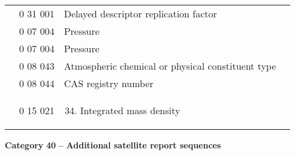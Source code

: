 \begin{longtable}[]{@{}llll@{}}
& 0 31 001 & Delayed descriptor replication factor &\tabularnewline
& 0 07 004 & Pressure &\tabularnewline
& 0 07 004 & Pressure &\tabularnewline
& 0 08 043 & Atmospheric chemical or physical constituent type &\tabularnewline
& 0 08 044 & CAS registry number &\tabularnewline
\begin{minipage}[t]{0.22\columnwidth}\raggedright
\strut
\end{minipage} & \begin{minipage}[t]{0.22\columnwidth}\raggedright
0 15 021\strut
\end{minipage} & \begin{minipage}[t]{0.22\columnwidth}\raggedright
\begin{enumerate}
\setcounter{enumi}{33}
\item
  Integrated mass density
\end{enumerate}\strut
\end{minipage} & \begin{minipage}[t]{0.22\columnwidth}\raggedright
\strut
\end{minipage}\tabularnewline
\bottomrule
\end{longtable}

\textbf{Category} \textbf{40} \textbf{--} \textbf{Additional satellite report sequences}

